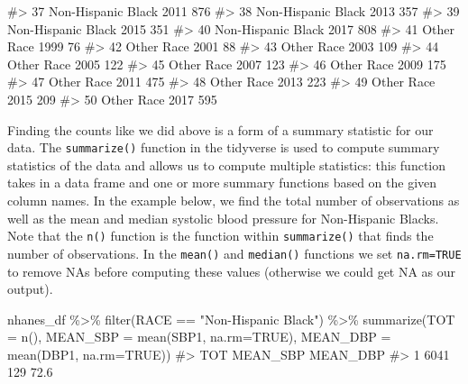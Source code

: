 \documentclass[
  letterpaper,
]{krantz}
\makeatletter
\newenvironment{Shaded}{\begin{snugshade}}{\end{snugshade}}
\newcommand{\AttributeTok}[1]{\textcolor[rgb]{0.40,0.45,0.13}{#1}}
\newcommand{\CommentTok}[1]{\textcolor[rgb]{0.37,0.37,0.37}{#1}}
\newcommand{\ConstantTok}[1]{\textcolor[rgb]{0.56,0.35,0.01}{#1}}
\newcommand{\FunctionTok}[1]{\textcolor[rgb]{0.28,0.35,0.67}{#1}}
\newcommand{\NormalTok}[1]{\textcolor[rgb]{0.00,0.23,0.31}{#1}}
\newcommand{\SpecialCharTok}[1]{\textcolor[rgb]{0.37,0.37,0.37}{#1}}
\newcommand{\StringTok}[1]{\textcolor[rgb]{0.13,0.47,0.30}{#1}}
\newenvironment{kframe}{%
\medskip{}
\setlength{\fboxsep}{.8em}
 \def\at@end@of@kframe{}%
 \ifinner\ifhmode%
  \def\at@end@of@kframe{\end{minipage}}%
  \begin{minipage}{\columnwidth}%
 \fi\fi%
 \def\FrameCommand##1{\hskip\@totalleftmargin \hskip-\fboxsep
 \colorbox{shadecolor}{##1}\hskip-\fboxsep
     \hskip-\linewidth \hskip-\@totalleftmargin \hskip\columnwidth}%
 \MakeFramed {\advance\hsize-\width
   \@totalleftmargin\z@ \linewidth\hsize
   \@setminipage}}%
 {\par\unskip\endMakeFramed%
 \at@end@of@kframe}
\renewenvironment{Shaded}{\begin{kframe}}{\end{kframe}}
\makeatother
\begin{document}
\begin{Shaded}
\begin{Highlighting}[]
\CommentTok{\#\textgreater{} 37 Non{-}Hispanic Black 2011  876}
\CommentTok{\#\textgreater{} 38 Non{-}Hispanic Black 2013  357}
\CommentTok{\#\textgreater{} 39 Non{-}Hispanic Black 2015  351}
\CommentTok{\#\textgreater{} 40 Non{-}Hispanic Black 2017  808}
\CommentTok{\#\textgreater{} 41         Other Race 1999   76}
\CommentTok{\#\textgreater{} 42         Other Race 2001   88}
\CommentTok{\#\textgreater{} 43         Other Race 2003  109}
\CommentTok{\#\textgreater{} 44         Other Race 2005  122}
\CommentTok{\#\textgreater{} 45         Other Race 2007  123}
\CommentTok{\#\textgreater{} 46         Other Race 2009  175}
\CommentTok{\#\textgreater{} 47         Other Race 2011  475}
\CommentTok{\#\textgreater{} 48         Other Race 2013  223}
\CommentTok{\#\textgreater{} 49         Other Race 2015  209}
\CommentTok{\#\textgreater{} 50         Other Race 2017  595}
\end{Highlighting}
\end{Shaded}

Finding the counts like we did above is a form of a summary statistic
for our data. The \texttt{summarize()} function in the tidyverse is used
to compute summary statistics of the data and allows us to compute
multiple statistics: this function takes in a data frame and one or more
summary functions based on the given column names. In the example below,
we find the total number of observations as well as the mean and median
systolic blood pressure for Non-Hispanic Blacks. Note that the
\texttt{n()} function is the function within \texttt{summarize()} that
finds the number of observations. In the \texttt{mean()} and
\texttt{median()} functions we set \texttt{na.rm=TRUE} to remove NAs
before computing these values (otherwise we could get NA as our output).

\begin{Shaded}
\begin{Highlighting}[]
\NormalTok{nhanes\_df }\SpecialCharTok{\%\textgreater{}\%}
  \FunctionTok{filter}\NormalTok{(RACE }\SpecialCharTok{==} \StringTok{"Non{-}Hispanic Black"}\NormalTok{) }\SpecialCharTok{\%\textgreater{}\%}
  \FunctionTok{summarize}\NormalTok{(}\AttributeTok{TOT =} \FunctionTok{n}\NormalTok{(), }\AttributeTok{MEAN\_SBP =} \FunctionTok{mean}\NormalTok{(SBP1, }\AttributeTok{na.rm=}\ConstantTok{TRUE}\NormalTok{), }
            \AttributeTok{MEAN\_DBP =} \FunctionTok{mean}\NormalTok{(DBP1, }\AttributeTok{na.rm=}\ConstantTok{TRUE}\NormalTok{))}
\CommentTok{\#\textgreater{}    TOT MEAN\_SBP MEAN\_DBP}
\CommentTok{\#\textgreater{} 1 6041      129     72.6}
\end{Highlighting}
\end{Shaded}
\end{document}
